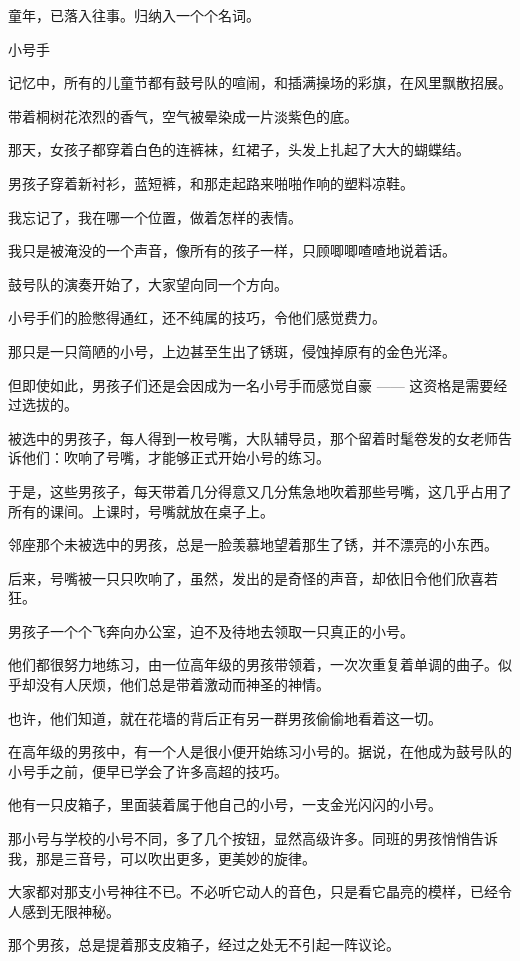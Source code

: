 \documentclass[12pt,a4paper]{article}
\newcommand{\subpart}[1]{
	\begingroup \par
	\vspace{1ex} \centering #1
	\par \endgroup \nopagebreak[4]
}
\begin{document}
		童年，已落入往事。归纳入一个个名词。

		\subpart{小号手}

		记忆中，所有的儿童节都有鼓号队的喧闹，和插满操场的彩旗，在风里飘散招展。\par
		带着桐树花浓烈的香气，空气被晕染成一片淡紫色的底。\par
		那天，女孩子都穿着白色的连裤袜，红裙子，头发上扎起了大大的蝴蝶结。\par
		男孩子穿着新衬衫，蓝短裤，和那走起路来啪啪作响的塑料凉鞋。

		我忘记了，我在哪一个位置，做着怎样的表情。\par
		我只是被淹没的一个声音，像所有的孩子一样，只顾唧唧喳喳地说着话。

		鼓号队的演奏开始了，大家望向同一个方向。\par
		小号手们的脸憋得通红，还不纯属的技巧，令他们感觉费力。

		那只是一只简陋的小号，上边甚至生出了锈斑，侵蚀掉原有的金色光泽。\par
		但即使如此，男孩子们还是会因成为一名小号手而感觉自豪 —— 这资格是需要经过选拔的。\par
		被选中的男孩子，每人得到一枚号嘴，大队辅导员，那个留着时髦卷发的女老师告诉他们：吹响了号嘴，才能够正式开始小号的练习。\par
		于是，这些男孩子，每天带着几分得意又几分焦急地吹着那些号嘴，这几乎占用了所有的课间。上课时，号嘴就放在桌子上。\par
		邻座那个未被选中的男孩，总是一脸羡慕地望着那生了锈，并不漂亮的小东西。

		后来，号嘴被一只只吹响了，虽然，发出的是奇怪的声音，却依旧令他们欣喜若狂。\par
		男孩子一个个飞奔向办公室，迫不及待地去领取一只真正的小号。

		他们都很努力地练习，由一位高年级的男孩带领着，一次次重复着单调的曲子。似乎却没有人厌烦，他们总是带着激动而神圣的神情。\par
		也许，他们知道，就在花墙的背后正有另一群男孩偷偷地看着这一切。

		在高年级的男孩中，有一个人是很小便开始练习小号的。据说，在他成为鼓号队的小号手之前，便早已学会了许多高超的技巧。\par
		他有一只皮箱子，里面装着属于他自己的小号，一支金光闪闪的小号。\par
		那小号与学校的小号不同，多了几个按钮，显然高级许多。同班的男孩悄悄告诉我，那是三音号，可以吹出更多，更美妙的旋律。\par
		大家都对那支小号神往不已。不必听它动人的音色，只是看它晶亮的模样，已经令人感到无限神秘。\par
		那个男孩，总是提着那支皮箱子，经过之处无不引起一阵议论。
\end{document}
